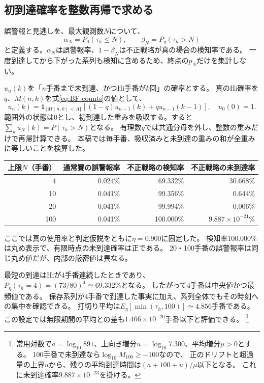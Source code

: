 \documentclass[11pt,a4paper]{article}
\numberwithin{equation}{section}
\begin{document}
\subsection{初到達確率を整数再帰で求める}
誤警報と見逃しを、最大観測数$N$について、
\begin{equation}
\alpha_N=P_0(\tau_h\le N),\qquad
\beta_N=P_\eta(\tau_h>N)
\end{equation}
と定義する。$\alpha_N$は誤警報率、$1-\beta_N$は不正戦略が真の場合の検知率である。
一度到達してから下がった系列も検知に含めるため、終点の$p_N$だけを集計しない。

$u_n(k)$を「$n$手番まで未到達、かつHi手番が$k$回」の確率とする。
真のHi確率を$q$、$M(n,k)$を式\eqref{eq:BF-counts}の値として、
\begin{equation}
u_n(k)=\mathbf1_{\{M(n,k)<A\}}
\left[(1-q)u_{n-1}(k)+q u_{n-1}(k-1)\right],\quad u_0(0)=1.
\label{eq:dp}
\end{equation}
範囲外の状態は0とし、初到達した重みを吸収する。すると$\sum_k u_N(k)=P(\tau_h>N)$となる。
有理数$q$では共通分母を外し、整数の重みだけで再帰計算できる。
本稿では毎手番、吸収済みと未到達の重みの和が全重みに等しいことを検算した。

\begin{center}
\small
\begin{tabular}{rrrr}
\toprule
上限$N$（手番）&通常賽の誤警報率&不正戦略の検知率&不正戦略の未到達率\\
\midrule
4&0.024\%&69.332\%&30.668\%\\
10&0.041\%&99.356\%&0.644\%\\
20&0.041\%&99.994\%&0.006\%\\
100&0.041\%&100.000\%&$9.887\times10^{-21}\%$\\
\bottomrule
\end{tabular}
\end{center}
ここでは真の使用率と判定仮説をともに$\eta=0.900$に固定した。
検知率100.000\%は丸め表示で、有限時点の未到達確率は正である。
20・100手番の誤警報率は同じ丸め値だが、内部の厳密値は異なる。

最短の到達はHiが4手番連続したときであり、
$P_\eta(\tau_h=4)=(73/80)^4\simeq69.332\%$となる。
したがって4手番は中央値かつ最頻値である。
保存系列が4手番で到達した事実に加え、系列全体でもその時刻への集中を確認できる。
打切り平均は$E_\eta[\min(\tau_h,100)]\simeq4.856$手番である。
この設定では無限期間の平均との差も$1.466\times10^{-20}$手番以下と評価できる。
\footnote{常用対数で$a=\log_{10}891$、上向き増分$u=\log_{10}7.300$、平均増分$\mu>0$とする。
100手番で未到達なら$\log_{10}M_{100}\ge-100$なので、
正のドリフトと超過量の上界$u$から、残りの平均到達時間は$(a+100+u)/\mu$以下となる。
これに未到達確率$9.887\times10^{-23}$を掛ける。}
\end{document}
